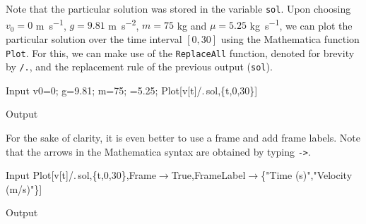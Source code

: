 \begin{example}
Note that the particular solution was stored in the variable \lstinline{sol}. Upon choosing $v_0=0$ \si{m.s^{-1}}, $g=9.81$ \si{m.s^{-2}}, $m=75$ \si{kg} and $\mu=5.25$ \si{kg.s^{-1}}, we can plot the particular solution over the time interval $[0,30]$ using the Mathematica function \lstinline{Plot}. 
For this, we can make use of the \lstinline{ReplaceAll} function, denoted for brevity by \lstinline{/.}, and the replacement rule of the previous output (\lstinline{sol}).
\begin{mdframed}[default,backgroundcolor=gray!40,roundcorner=8pt]
\begin{mmaCell}[moredefined={sol},morefunctionlocal={t}]{Input}
  v0=0;
		g=9.81;
		m=75;
		\mmaUnd{\(\pmb{\mu}\)}=5.25;
		Plot[v[t]/.\(\pmb{\,}\)sol,\{t,0,30\}]
\end{mmaCell}

\begin{mmaCell}[moregraphics={moreig={scale=.4}}]{Output}
\end{mmaCell}
\end{mdframed}

For the sake of clarity, it is even better to use a frame and add frame labels. Note that the arrows in the Mathematica syntax are obtained by typing \lstinline{->}.
\begin{mdframed}[default,backgroundcolor=gray!40,roundcorner=8pt]
\begin{mmaCell}[morefunctionlocal={t},moredefined={sol}]{Input}
  Plot[v[t]/.\(\pmb{\,}\)sol,\{t,0,30\},Frame\(\pmb{\to}\)True,FrameLabel\(\pmb{\to}\)\{"Time (s)","Velocity (m/s)"\}]
\end{mmaCell}

\begin{mmaCell}[moregraphics={moreig={scale=.4}}]{Output}
\end{mmaCell}
\end{mdframed}
\fi


\end{example}
